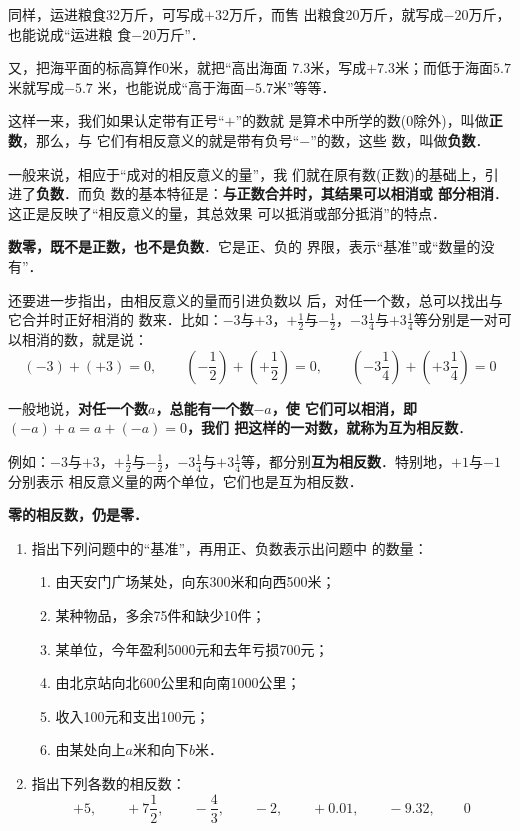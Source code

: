 同样，运进粮食32万斤，可写成$+32$万斤，而售
出粮食20万斤，就写成$-20$万斤，也能说成“运进粮
食$-20$万斤”．

又，把海平面的标高算作0米，就把“高出海面
7.3米，写成$+7. 3$米；而低于海面$5.7$米就写成$-5.7$
米，也能说成“高于海面$-5. 7$米”等等．

这样一来，我们如果认定带有正号“$+$”的数就
是算术中所学的数(0除外)，叫做\textbf{正数}，那么，与
它们有相反意义的就是带有负号“$-$”的数，这些
数，叫做\textbf{负数}．

一般来说，相应于“成对的相反意义的量”，我
们就在原有数(正数)的基础上，引进了\textbf{负数}．而负
数的基本特征是：\textbf{与正数合并时，其结果可以相消或
	部分相消}．这正是反映了“相反意义的量，其总效果
可以抵消或部分抵消”的特点．

\textbf{数零，既不是正数，也不是负数}．它是正、负的
界限，表示“基准”或“数量的没有”．

还要进一步指出，由相反意义的量而引进负数以
后，对任一个数，总可以找出与它合并时正好相消的
数来．比如：$-3$与$+3$，$+\frac{1}{2}$与$-\frac{1}{2}$，$-3\frac{1}{4}$与$+3\frac{1}{4}$等分别是一对可以相消的数，就是说：
\[(-3)+(+3)=0,\qquad \left(-\frac{1}{2}\right)+\left(+\frac{1}{2}\right)=0,\qquad \left(-3\frac{1}{4}\right)+\left(+3\frac{1}{4}\right)=0 \]

一般地说，\textbf{对任一个数$a$，总能有一个数$-a$，使
	它们可以相消，即$(-a) +a=a+ (-a) = 0$，我们
	把这样的一对数，就称为互为相反数}．

例如：$-3$与$+3$，$+\frac{1}{2}$与$-\frac{1}{2}$，$-3\frac{1}{4}$与$+3\frac{1}{4}$等，都分别\textbf{互为相反数}．特别地，$+1$与$-1$分别表示
相反意义量的两个单位，它们也是互为相反数．

\textbf{零的相反数，仍是零．}

\begin{ex}
	\begin{enumerate}
		\item 指出下列问题中的“基准”，再用正、负数表示出问题中
		的数量：
		\begin{enumerate}
			\item 由天安门广场某处，向东300米和向西500米；
			\item 某种物品，多余75件和缺少10件；
			\item 某单位，今年盈利5000元和去年亏损700元；
			\item 由北京站向北600公里和向南1000公里；
			\item 收入100元和支出100元；
			\item 由某处向上$a$米和向下$b$米．
		\end{enumerate}
		
		\item 指出下列各数的相反数：
		\[+5,\qquad +7\frac{1}{2},\qquad -\frac{4}{3},\qquad -2,\qquad +0.01,\qquad -9.32,\qquad 0 \]
	\end{enumerate}   
\end{ex}

